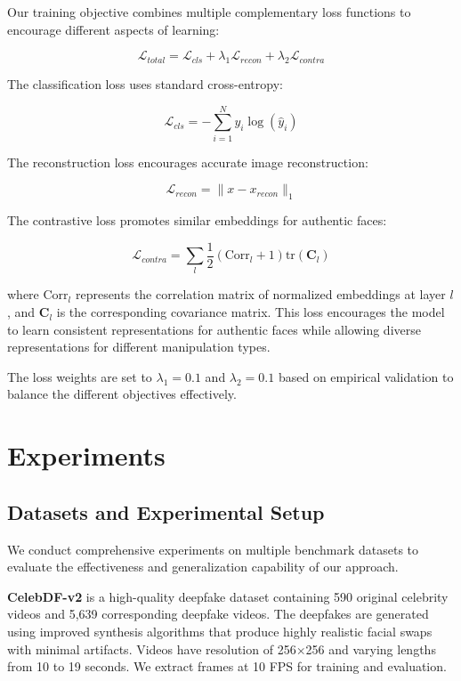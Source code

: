 \documentclass[letterpaper]{article} %
\begin{document}
Our training objective combines multiple complementary loss functions to encourage different aspects of learning:

\begin{equation}
\mathcal{L}_{total} = \mathcal{L}_{cls} + \lambda_1 \mathcal{L}_{recon} + \lambda_2 \mathcal{L}_{contra}
\end{equation}

The classification loss uses standard cross-entropy:

\begin{equation}
\mathcal{L}_{cls} = -\sum_{i=1}^{N} y_i \log(\hat{y}_i)
\end{equation}

The reconstruction loss encourages accurate image reconstruction:

\begin{equation}
\mathcal{L}_{recon} = \|x - x_{recon}\|_1
\end{equation}

The contrastive loss promotes similar embeddings for authentic faces:

\begin{equation}
\mathcal{L}_{contra} = \sum_{l} \frac{1}{2}(\text{Corr}_l + 1) \text{tr}(\mathbf{C}_l)
\end{equation}

where $\text{Corr}_l$ represents the correlation matrix of normalized embeddings at layer $l$, and $\mathbf{C}_l$ is the corresponding covariance matrix. This loss encourages the model to learn consistent representations for authentic faces while allowing diverse representations for different manipulation types.

The loss weights are set to $\lambda_1 = 0.1$ and $\lambda_2 = 0.1$ based on empirical validation to balance the different objectives effectively.

\section{Experiments}

\subsection{Datasets and Experimental Setup}

We conduct comprehensive experiments on multiple benchmark datasets to evaluate the effectiveness and generalization capability of our approach.

\textbf{CelebDF-v2} is a high-quality deepfake dataset containing 590 original celebrity videos and 5,639 corresponding deepfake videos. The deepfakes are generated using improved synthesis algorithms that produce highly realistic facial swaps with minimal artifacts. Videos have resolution of 256×256 and varying lengths from 10 to 19 seconds. We extract frames at 10 FPS for training and evaluation.
\end{document}
